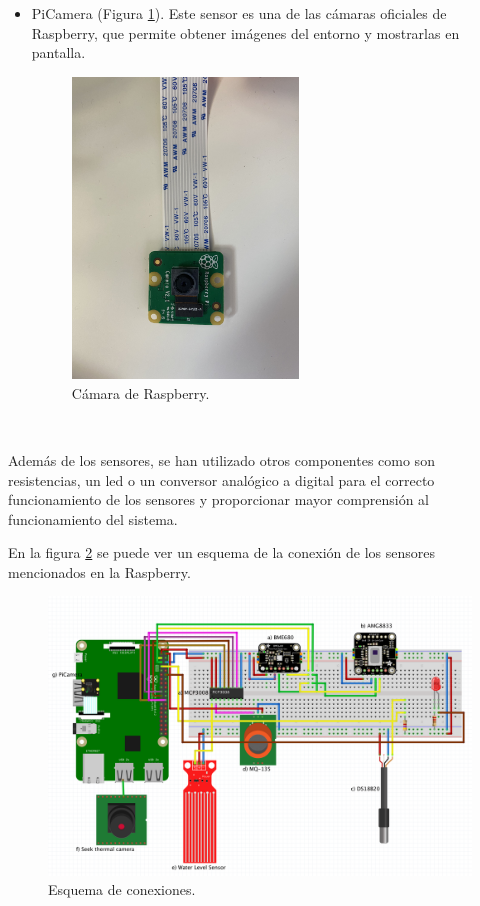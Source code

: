 \begin{itemize}
\item{PiCamera (Figura \ref{fig:picam}).} Este sensor es una de las cámaras oficiales de Raspberry, que permite obtener imágenes del entorno y mostrarlas en pantalla.
\begin{figure} [h!]
  \begin{center}
    \includegraphics[width=6cm]{figs/picam}
  \end{center}
  \caption{Cámara de Raspberry.}
  \label{fig:picam}
\end{figure}\\
\end{itemize}

Además de los sensores, se han utilizado otros componentes como son resistencias, un led o un conversor analógico a digital para el correcto funcionamiento de los sensores y proporcionar mayor comprensión al funcionamiento del sistema.

En la figura \ref{fig:esquema} se puede ver un esquema de la conexión de los sensores mencionados en la Raspberry.
\begin{figure} [h!]
  \begin{center}
    \includegraphics[width=14cm]{figs/esquema}
  \end{center}
  \caption{Esquema de conexiones.}
  \label{fig:esquema}
\end{figure}\\












